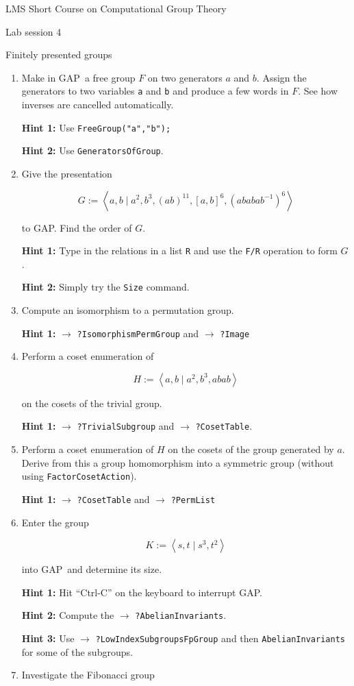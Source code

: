 \documentclass[12pt]{article}
\newcommand{\GAP}{\textsf{GAP}}
\newcommand{\hint}[1]{\par\textbf{Hint #1:}}
\newcommand{\see}[1]{$\to$ \texttt{?#1}}
\begin{document}
\begin{center}
\large LMS Short Course on Computational Group Theory

\Large Lab session 4

\large Finitely presented groups
\end{center}

\begin{enumerate}
\setlength{\parskip}{0pt}
\item Make in \GAP\ a free group $F$ on two generators $a$ and $b$. Assign
the generators to two variables \texttt{a} and \texttt{b} and produce
a few words in $F$. See how inverses are cancelled automatically.
\hint{1} Use \texttt{FreeGroup("a","b");}
\hint{2} Use \texttt{GeneratorsOfGroup}.
\item Give the presentation

\vspace*{-2mm}
\[ G := \left< a,b \mid a^2, b^3, (ab)^{11}, [a,b]^6, (ababab^{-1})^6 \right> \]

\vspace*{-2mm}
to \GAP. Find the order of $G$.
\hint{1} Type in the relations in a list \texttt{R} and use the
\texttt{F/R} operation to form $G$.
\hint{2} Simply try the \texttt{Size} command.
\item Compute an isomorphism to a permutation group.
\hint{1} \see{IsomorphismPermGroup} and \see{Image}
\item Perform a coset enumeration of

\vspace*{-2mm}
\[ H := \left< a,b \mid a^2, b^3, abab\right> \]

\vspace*{-2mm}
on the cosets of the trivial group.
\hint{1} \see{TrivialSubgroup} and \see{CosetTable}.
\item Perform a coset enumeration of $H$ on the cosets of the group
generated by $a$. Derive from this a group homomorphism into
a symmetric group (without using \texttt{Factor\-Coset\-Action}).
\hint{1} \see{CosetTable} and \see{PermList}
\item Enter the group

\vspace*{-2mm}
\[ K := \left< s, t \mid s^3, t^2\right> \]

\vspace*{-2mm}
into \GAP\ and determine its size.
\hint{1} Hit ``Ctrl-C'' on the keyboard to interrupt \GAP.
\hint{2} Compute the \see{AbelianInvariants}.
\hint{3} Use \see{LowIndexSubgroupsFpGroup} and then
\texttt{AbelianInvariants} for some of the subgroups.
\item Investigate the Fibonacci group 


\end{enumerate}
\end{document}
